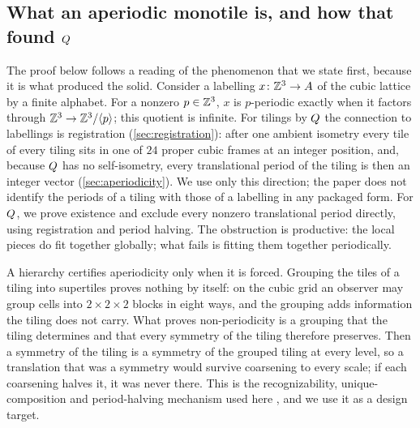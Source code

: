 \subsection{What an aperiodic monotile is, and how that found \texorpdfstring{$Q$}{Q}}\label{sec:reading}

The proof below follows a reading of the phenomenon that we state first, because it is what
produced the solid. Consider a labelling $x\colon\mathbb{Z}^3\to A$ of the cubic lattice by a finite
alphabet. For a nonzero $p\in\mathbb{Z}^3$, $x$ is $p$-periodic exactly when it factors through
$\mathbb{Z}^3\to\mathbb{Z}^3/\langle p\rangle$; this quotient is infinite. For tilings by $Q$ the connection
to labellings is
registration (\cref{sec:registration}): after one ambient isometry every tile of every tiling
sits in one of $24$ proper cubic frames at an integer position, and, because $Q$ has no
self-isometry, every translational period of the tiling is then an integer vector
(\cref{sec:aperiodicity}). We use only this direction; the paper does not identify the periods of
a tiling with those of a labelling in any packaged form. For $Q$, we prove existence and
exclude every nonzero translational period directly, using registration and period halving. The
obstruction is productive: the local pieces do fit together globally; what fails is fitting them
together periodically.

A hierarchy certifies aperiodicity only when it is forced. Grouping the tiles of a tiling into
supertiles proves nothing by itself: on the cubic grid an observer may group cells into
$2\times2\times2$ blocks in eight ways, and the grouping adds information the tiling does not
carry. What proves non-periodicity is a grouping that the tiling determines and that every
symmetry of the tiling therefore preserves. Then a symmetry of the tiling is a symmetry of the
grouped tiling at every level, so a translation that was a symmetry would survive coarsening to
every scale; if each coarsening halves it, it was never there. This is the recognizability,
unique-composition and period-halving mechanism used here \cite{GS18,SMKGS24b}, and we use it as
a design target.

